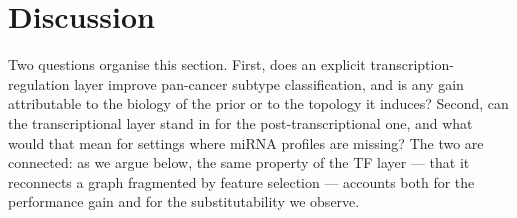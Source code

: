 \documentclass[review,3p,times,11pt, ]{elsarticle} %
\begin{document}

%
\section{Discussion}
\label{sec:discussion}

Two questions organise this section. First, does an explicit
transcription-regulation layer improve pan-cancer subtype
classification, and is any gain attributable to the biology of the
prior or to the topology it induces? Second, can the transcriptional
layer stand in for the post-transcriptional one, and what would that
mean for settings where miRNA profiles are missing? The two are
connected: as we argue below, the same property of the TF layer — that
it reconnects a graph fragmented by feature selection — accounts both
for the performance gain and for the substitutability we observe.
\end{document}
